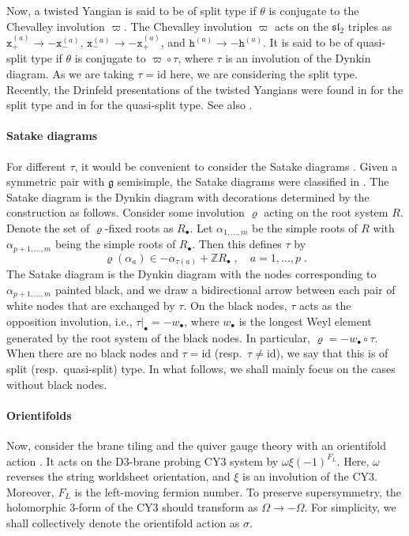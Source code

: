 \documentclass[11pt]{article}
\numberwithin{equation}{section}
\numberwithin{figure}{section}
\numberwithin{table}{section}
\begin{document}
Now, a twisted Yangian is said to be of split type if $\theta$ is conjugate to the Chevalley involution $\varpi$. The Chevalley involution $\varpi$ acts on the $\mathfrak{sl}_2$ triples as $\mathtt{x}_+^{(a)}\rightarrow-\mathtt{x}_-^{(a)}$, $\mathtt{x}_-^{(a)}\rightarrow-\mathtt{x}_+^{(a)}$, and $\mathtt{h}^{(a)}\rightarrow-\mathtt{h}^{(a)}$. It is said to be of quasi-split type if $\theta$ is conjugate to $\varpi\circ\tau$, where $\tau$ is an involution of the Dynkin diagram. As we are taking $\tau=\mathrm{id}$ here, we are considering the split type. Recently, the Drinfeld presentations of the twisted Yangians were found in \cite{Lu_2025,lu2025affine,Lu_2026} for the split type and in \cite{2024arXiv240806981L,huang2026quasi} for the quasi-split type. See also \cite{lu2026classification}.

\paragraph{Satake diagrams} For different $\tau$, it would be convenient to consider the Satake diagrams \cite{satake1960representations}. Given a symmetric pair with $\mathfrak{g}$ semisimple, the Satake diagrams were classified in \cite{araki1962root}. The Satake diagram is the Dynkin diagram with decorations determined by the construction as follows. Consider some involution $\varrho$ acting on the root system $R$. Denote the set of $\varrho$-fixed roots as $R_\bullet$. Let $\alpha_{1,\dots,m}$ be the simple roots of $R$ with $\alpha_{p+1,\dots,m}$ being the simple roots of $R_\bullet$. Then this defines $\tau$ by
\begin{equation}
	\varrho(\alpha_a)\in-\alpha_{\tau(a)}+\mathbb{Z}R_\bullet\;,\quad a=1,\dots,p\;.
\end{equation}
The Satake diagram is the Dynkin diagram with the nodes corresponding to $\alpha_{p+1,\dots,m}$ painted black, and we draw a bidirectional arrow between each pair of white nodes that are exchanged by $\tau$. On the black nodes, $\tau$ acts as the opposition involution, i.e., $\tau|_\bullet=-w_\bullet$, where $w_\bullet$ is the longest Weyl element generated by the root system of the black nodes. In particular, $\varrho=-w_\bullet\circ\tau$. When there are no black nodes and $\tau=\mathrm{id}$ (resp.~$\tau\neq\mathrm{id}$), we say that this is of split (resp.~quasi-split) type. In what follows, we shall mainly focus on the cases without black nodes.

\paragraph{Orientifolds} Now, consider the brane tiling and the quiver gauge theory with an orientifold action \cite{Franco:2007ii}. It acts on the D3-brane probing CY3 system by $\omega\xi(-1)^{F_L}$. Here, $\omega$ reverses the string worldsheet orientation, and $\xi$ is an involution of the CY3. Moreover, $F_L$ is the left-moving fermion number. To preserve supersymmetry, the holomorphic 3-form of the CY3 should transform as $\Omega\rightarrow-\Omega$. For simplicity, we shall collectively denote the orientifold action as $\sigma$.
\end{document}
